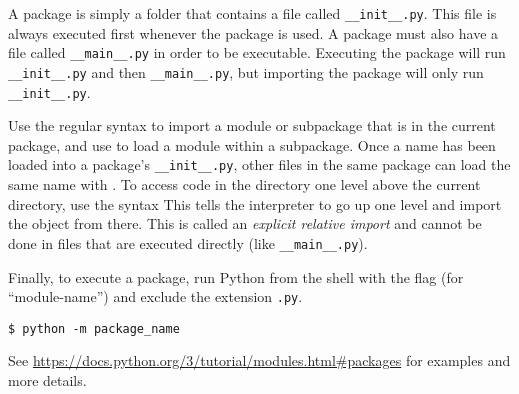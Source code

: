 A package is simply a folder that contains a file called \texttt{\_\_init\_\_.py}.
This file is always executed first whenever the package is used.
A package must also have a file called \texttt{\_\_main\_\_.py} in order to be executable.
Executing the package will run \texttt{\_\_init\_\_.py} and then \texttt{\_\_main\_\_.py}, but importing the package will only run \texttt{\_\_init\_\_.py}.

Use the regular syntax to import a module or subpackage that is in the current package, and use  to load a module within a subpackage.
Once a name has been loaded into a package's \texttt{\_\_init\_\_.py}, other files in the same package can load the same name with .
To access code in the directory one level above the current directory, use the syntax 
This tells the interpreter to go up one level and import the object from there.
This is called an \emph{explicit relative import} and cannot be done in files that are executed directly (like \texttt{\_\_main\_\_.py}).

Finally, to execute a package, run Python from the shell with the flag  (for ``module-name'') and exclude the extension \texttt{.py}.

\begin{lstlisting}
$ python -m package_name
\end{lstlisting}

See \url{https://docs.python.org/3/tutorial/modules.html\#packages} for examples and more details.
